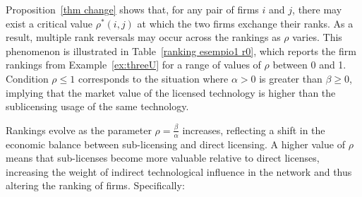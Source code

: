 \documentclass[preprint,11pt,authoryear]{elsarticle}
\theoremstyle{plain}
\begin{document}
Proposition~\ref{thm change} shows that, for any pair of firms \( i \) and \( j \), there may exist a critical value \( \rho^*(i, j) \) at which the two firms exchange their ranks. As a result, multiple rank reversals may occur across the rankings as \( \rho \) varies.  This phenomenon is illustrated in Table~\ref{ranking esempio1 r0}, which reports the firm rankings from Example~\ref{ex:threeU} for a range of values of \( \rho \) between 0 and 1. Condition \( \rho \leq 1 \) corresponds to the situation where \( \alpha>0 \) is greater than \( \beta \geq 0 \), implying that the market value of the licensed technology is higher than the sublicensing usage of the same technology.

\begin{table}[H]
\centering
{}
\caption{Node rankings across multiple intervals of the value $\rho = \beta/\alpha$ subject to $ \rho \leq 1$.}
\label{ranking esempio1 r0} 
\end{table}
Rankings evolve as the parameter \( \rho = \frac{\beta}{\alpha} \) increases, reflecting a shift in the economic balance between sub-licensing and direct licensing. A higher value of \( \rho \) means that sub-licenses become more valuable relative to direct licenses, increasing the weight of indirect technological influence in the network and thus altering the ranking of firms. Specifically:
\end{document}
